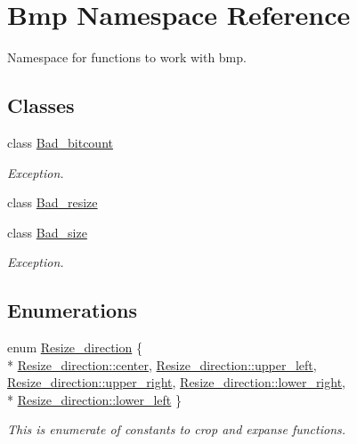 \hypertarget{namespaceBmp}{}\section{Bmp Namespace Reference}
\label{namespaceBmp}


Namespace for functions to work with bmp.  


\subsection*{Classes}
\begin{DoxyCompactItemize}
\item 
class \hyperlink{classBmp_1_1Bad__bitcount}{Bad\+\_\+bitcount}
\begin{DoxyCompactList}\small\item\em Exception. \end{DoxyCompactList}\item 
class \hyperlink{classBmp_1_1Bad__resize}{Bad\+\_\+resize}
\item 
class \hyperlink{classBmp_1_1Bad__size}{Bad\+\_\+size}
\begin{DoxyCompactList}\small\item\em Exception. \end{DoxyCompactList}\end{DoxyCompactItemize}
\subsection*{Enumerations}
\begin{DoxyCompactItemize}
\item 
enum \hyperlink{namespaceBmp_a17aedbe2a7f4fccdb8542a417187eea7}{Resize\+\_\+direction} \{ \\*
\hyperlink{namespaceBmp_a17aedbe2a7f4fccdb8542a417187eea7aadb115059e28d960fa8badfac5516667}{Resize\+\_\+direction\+::center}, 
\hyperlink{namespaceBmp_a17aedbe2a7f4fccdb8542a417187eea7a3f34ebfdc06155d551b08c312bcbb887}{Resize\+\_\+direction\+::upper\+\_\+left}, 
\hyperlink{namespaceBmp_a17aedbe2a7f4fccdb8542a417187eea7ae2737351ff33200a51dd13b033212b86}{Resize\+\_\+direction\+::upper\+\_\+right}, 
\hyperlink{namespaceBmp_a17aedbe2a7f4fccdb8542a417187eea7a9e516376e65d5f93e5be1edfe72522c6}{Resize\+\_\+direction\+::lower\+\_\+right}, 
\\*
\hyperlink{namespaceBmp_a17aedbe2a7f4fccdb8542a417187eea7a67554c25267171d1850889601cecf8a1}{Resize\+\_\+direction\+::lower\+\_\+left}
 \}\begin{DoxyCompactList}\small\item\em This is enumerate of constants to crop and expanse functions. \end{DoxyCompactList}
\end{DoxyCompactItemize}
